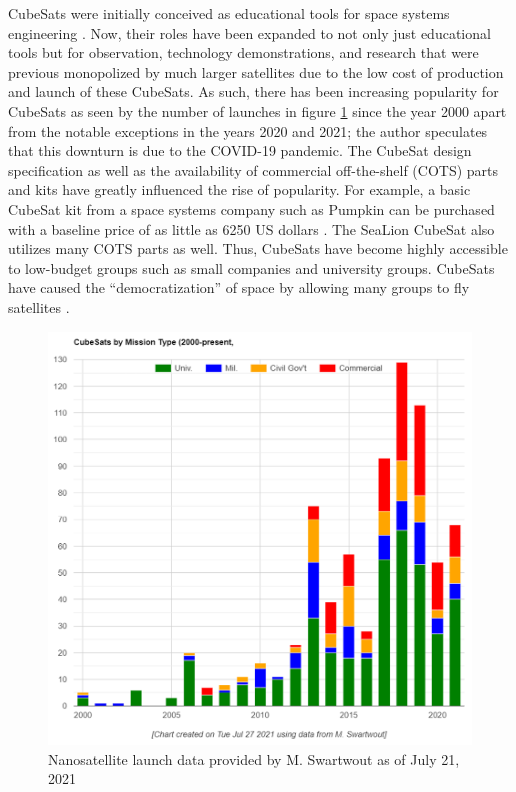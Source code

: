 \documentclass[journal,article,submit,pdftex,moreauthors]{Definitions/mdpi}
\begin{document}
CubeSats were initially conceived as educational tools for space systems engineering \cite{heidt_new}.  Now, their roles have been expanded to not only just educational tools but for observation, technology demonstrations, and research that were previous monopolized by much larger satellites due to the low cost of production and launch of these CubeSats.  As such, there has been increasing popularity for CubeSats as seen by the number of launches in figure \ref{fig:launch_data} since the year 2000 \cite{swartwout_data} apart from the notable exceptions in the years 2020 and 2021; the author speculates that this downturn is due to the COVID-19 pandemic.  The CubeSat design specification \cite{cds_rev14} as well as the availability of commercial off-the-shelf (COTS) parts and kits have greatly influenced the rise of popularity.  For example, a basic CubeSat kit from a space systems company such as Pumpkin can be purchased with a baseline price of as little as 6250 US dollars \cite{pumpkin_cubesat}.  The SeaLion CubeSat also utilizes many COTS parts as well.  Thus, CubeSats have become highly accessible to low-budget groups such as small companies and university groups.  CubeSats have caused the “democratization” of space by allowing many groups to fly satellites \cite{cubesat_handbook}.  

\begin{figure}[H]
    \includegraphics[width=13.75 cm]{assets/launch_data.png}
    \caption{Nanosatellite launch data provided by M. Swartwout as of July 21, 2021 \cite{swartwout_data}}
	\label{fig:launch_data}
    \end{figure}
	\noindent   
\unskip
\end{document}
